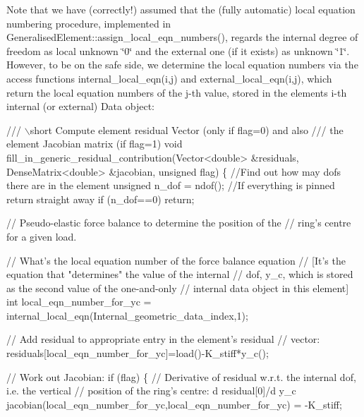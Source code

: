 \begin{DoxyEnumerate}
\end{DoxyEnumerate}Note that we have (correctly!) assumed that the (fully automatic) local equation numbering procedure, implemented in {\ttfamily Generalised\+Element\+::assign\+\_\+local\+\_\+eqn\+\_\+numbers()}, regards the internal degree of freedom as local unknown \char`\"{}0\char`\"{} and the external one (if it exists) as unknown \char`\"{}1\char`\"{}. However, to be on the safe side, we determine the local equation numbers via the access functions {\ttfamily internal\+\_\+local\+\_\+eqn(i,j)} and {\ttfamily external\+\_\+local\+\_\+eqn(i,j)}, which return the local equation numbers of the j-\/th value, stored in the element\textquotesingle{}s i-\/th internal (or external) {\ttfamily Data} object\+:


\begin{DoxyCodeInclude}
 \textcolor{comment}{/// \(\backslash\)short Compute element residual Vector (only if flag=0) and also}
\textcolor{comment}{ /// the element Jacobian matrix (if flag=1)}
\textcolor{comment}{} \textcolor{keywordtype}{void} fill\_in\_generic\_residual\_contribution(Vector<double> &residuals,
                                            DenseMatrix<double> &jacobian,
                                            \textcolor{keywordtype}{unsigned} flag)
  \{ 
   \textcolor{comment}{//Find out how may dofs there are in the element}
   \textcolor{keywordtype}{unsigned} n\_dof = ndof();
   \textcolor{comment}{//If everything is pinned return straight away}
   \textcolor{keywordflow}{if} (n\_dof==0) \textcolor{keywordflow}{return};
 
   \textcolor{comment}{// Pseudo-elastic force balance to determine the position of the}
   \textcolor{comment}{// ring's centre for a given load.}

   \textcolor{comment}{// What's the local equation number of the force balance equation}
   \textcolor{comment}{// [It's the equation that "determines" the value of the internal}
   \textcolor{comment}{// dof, y\_c, which is stored as the second value of the one-and-only}
   \textcolor{comment}{// internal data object in this element]}
   \textcolor{keywordtype}{int} local\_eqn\_number\_for\_yc = 
    internal\_local\_eqn(Internal\_geometric\_data\_index,1);

   \textcolor{comment}{// Add residual to appropriate entry in the element's residual}
   \textcolor{comment}{// vector:}
   residuals[local\_eqn\_number\_for\_yc]=load()-K\_stiff*y\_c();

   \textcolor{comment}{// Work out Jacobian: }
   \textcolor{keywordflow}{if} (flag)
    \{
     \textcolor{comment}{// Derivative of residual w.r.t. the internal dof, i.e. the vertical}
     \textcolor{comment}{// position of the ring's centre: d residual[0]/d y\_c}
     jacobian(local\_eqn\_number\_for\_yc,local\_eqn\_number\_for\_yc) = -K\_stiff;
     

\end{DoxyCodeInclude}
